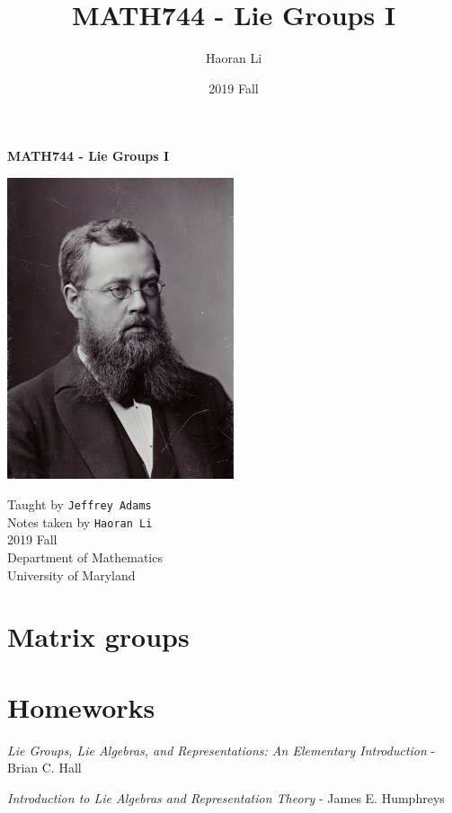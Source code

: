 \documentclass[a4paper,10pt]{article}
\title{MATH744 - Lie Groups I}
\author{Haoran Li}
\date{2019 Fall}
\begin{document}
\sloppy %

\begin{titlepage}
\begin{center}
\vspace*{1cm}
\LARGE
\textbf{MATH744 - Lie Groups I} \\
\vspace{2cm}
\begin{center}
\includegraphics[width=0.5\textwidth]{Pictures/Sophus_Lie.jpg}
\end{center}
\vspace{2cm}
\normalsize
Taught by \texttt{Jeffrey Adams} \\
Notes taken by \texttt{Haoran Li} \\
2019 Fall \\
\vspace{2cm}
Department of Mathematics\\
University of Maryland\\
\end{center}
\end{titlepage}

\tableofcontents
\newpage

\section{Matrix groups}

\newpage

\section{Homeworks}

\newpage

\begin{thebibliography}{}

\textit{Lie Groups, Lie Algebras, and Representations: An Elementary Introduction} - Brian C. Hall

\textit{Introduction to Lie Algebras and Representation Theory} - James E. Humphreys

\end{thebibliography}

\printindex
\newpage
\end{document}
